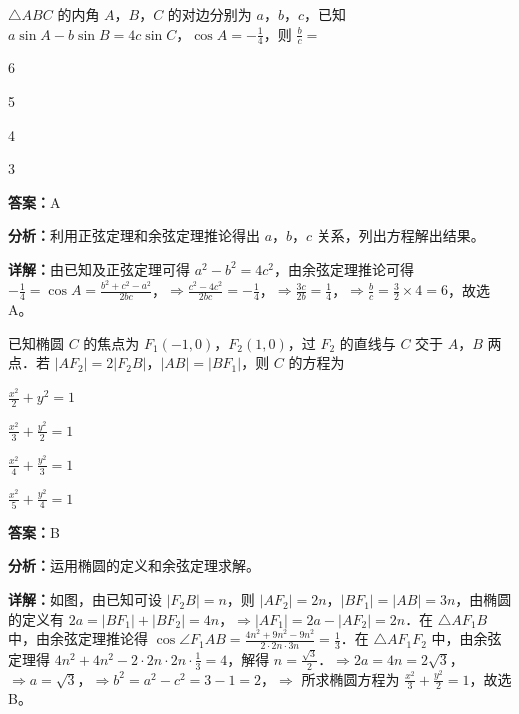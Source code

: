 \begin{question}[points=5]
$\triangle ABC$ 的内角 $A$，$B$，$C$ 的对边分别为 $a$，$b$，$c$，已知 $a\sin A - b\sin B = 4c\sin C$，$\cos A = -\frac{1}{4}$，则 $\frac{b}{c} =$
\begin{choices}
  \item 6
  \item 5
  \item 4
  \item 3
\end{choices}
\begin{solution}
\textbf{答案：}A

\textbf{分析：}利用正弦定理和余弦定理推论得出 $a$，$b$，$c$ 关系，列出方程解出结果。

\textbf{详解：}由已知及正弦定理可得 $a^2 - b^2 = 4c^2$，由余弦定理推论可得 $-\frac{1}{4} = \cos A = \frac{b^2+c^2-a^2}{2bc}$，$\Rightarrow \frac{c^2-4c^2}{2bc} = -\frac{1}{4}$，$\Rightarrow \frac{3c}{2b} = \frac{1}{4}$，$\Rightarrow \frac{b}{c} = \frac{3}{2} \times 4 = 6$，故选 A。
\end{solution}
\end{question}

\begin{question}[points=5]
已知椭圆 $C$ 的焦点为 $F_1(-1,0)$，$F_2(1,0)$，过 $F_2$ 的直线与 $C$ 交于 $A$，$B$ 两点．若 $|AF_2| = 2|F_2B|$，$|AB| = |BF_1|$，则 $C$ 的方程为
\begin{choices}
  \item $\frac{x^2}{2}+y^2=1$
  \item $\frac{x^2}{3}+\frac{y^2}{2}=1$
  \item $\frac{x^2}{4}+\frac{y^2}{3}=1$
  \item $\frac{x^2}{5}+\frac{y^2}{4}=1$
\end{choices}
\begin{solution}
\textbf{答案：}B

\textbf{分析：}运用椭圆的定义和余弦定理求解。

\textbf{详解：}如图，由已知可设 $|F_2B| = n$，则 $|AF_2| = 2n$，$|BF_1| = |AB| = 3n$，由椭圆的定义有 $2a = |BF_1|+|BF_2| = 4n$，$\Rightarrow |AF_1| = 2a - |AF_2| = 2n$．在 $\triangle AF_1B$ 中，由余弦定理推论得 $\cos\angle F_1AB = \frac{4n^2+9n^2-9n^2}{2\cdot 2n \cdot 3n} = \frac{1}{3}$．在 $\triangle AF_1F_2$ 中，由余弦定理得 $4n^2+4n^2-2\cdot 2n \cdot 2n \cdot \frac{1}{3} = 4$，解得 $n = \frac{\sqrt{3}}{2}$．$\Rightarrow 2a = 4n = 2\sqrt{3}$，$\Rightarrow a = \sqrt{3}$，$\Rightarrow b^2 = a^2 - c^2 = 3-1=2$，$\Rightarrow$ 所求椭圆方程为 $\frac{x^2}{3}+\frac{y^2}{2}=1$，故选 B。
\end{solution}
\end{question}

